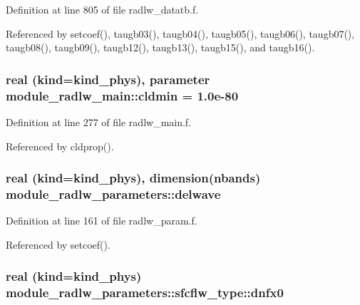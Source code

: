 Definition at line 805 of file radlw\+\_\+datatb.\+f.



Referenced by setcoef(), taugb03(), taugb04(), taugb05(), taugb06(), taugb07(), taugb08(), taugb09(), taugb12(), taugb13(), taugb15(), and taugb16().

\subsubsection[{\texorpdfstring{cldmin}{cldmin}}]{\setlength{\rightskip}{0pt plus 5cm}real (kind=kind\+\_\+phys), parameter module\+\_\+radlw\+\_\+main\+::cldmin = 1.\+0e-\/80\hspace{0.3cm}{\ttfamily [private]}}\hypertarget{group__module__radlw__main_gac55ad4a1ff397794e054be6647bafb73}{}\label{group__module__radlw__main_gac55ad4a1ff397794e054be6647bafb73}


Definition at line 277 of file radlw\+\_\+main.\+f.



Referenced by cldprop().

\subsubsection[{\texorpdfstring{delwave}{delwave}}]{\setlength{\rightskip}{0pt plus 5cm}real (kind=kind\+\_\+phys), dimension(nbands) module\+\_\+radlw\+\_\+parameters\+::delwave}\hypertarget{group__module__radlw__main_ga6ad1dff8ffc039d03c5cf3059344308e}{}\label{group__module__radlw__main_ga6ad1dff8ffc039d03c5cf3059344308e}


Definition at line 161 of file radlw\+\_\+param.\+f.



Referenced by setcoef().

\subsubsection[{\texorpdfstring{dnfx0}{dnfx0}}]{\setlength{\rightskip}{0pt plus 5cm}real (kind=kind\+\_\+phys) module\+\_\+radlw\+\_\+parameters\+::sfcflw\+\_\+type\+::dnfx0}\hypertarget{group__module__radlw__main_gadac8d084ff59310f6c6f4fdff1a0e5e6}{}\label{group__module__radlw__main_gadac8d084ff59310f6c6f4fdff1a0e5e6}


